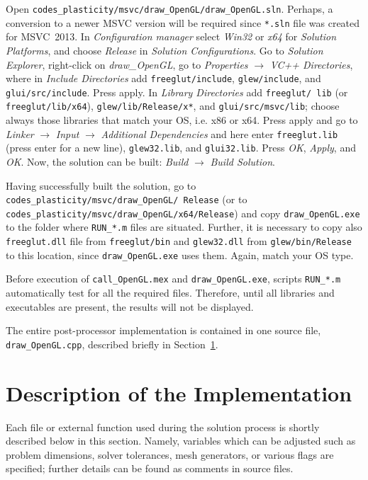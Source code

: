 \documentclass[preprint,12pt,authoryear]{elsarticle}
\begin{document}
Open \texttt{codes\_plasticity/msvc/draw\_OpenGL/draw\_OpenGL.sln}. Perhaps, a conversion to a newer MSVC version will be required since \texttt{*.sln} file was created for MSVC~2013. In \emph{Configuration manager} select \emph{Win32} or \emph{x64} for \emph{Solution Platforms}, and choose \emph{Release} in \emph{Solution Configurations}. Go to \emph{Solution Explorer}, right-click on \emph{draw\_OpenGL}, go to \emph{Properties} $\rightarrow$ \emph{VC++ Directories}, where in \emph{Include Directories} add \texttt{freeglut/include}, \texttt{glew/include}, and \texttt{glui/src/include}. Press apply. In \emph{Library Directories} add \texttt{freeglut/ lib} (or \texttt{freeglut/lib/x64}), \texttt{glew/lib/Release/x*}, and \texttt{glui/src/msvc/lib}; choose always those libraries that match your OS, i.e. x86 or x64. Press apply and go to \emph{Linker} $\rightarrow$ \emph{Input} $\rightarrow$ \emph{Additional Dependencies} and here enter \texttt{freeglut.lib} (press enter for a new line), \texttt{glew32.lib}, and \texttt{glui32.lib}. Press \emph{OK}, \emph{Apply}, and \emph{OK}. Now, the solution can be built: \emph{Build} $\rightarrow$ \emph{Build Solution}.

Having successfully built the solution, go to \texttt{codes\_plasticity/msvc/draw\_OpenGL/ Release} (or to \texttt{codes\_plasticity/msvc/draw\_OpenGL/x64/Release}) and copy \texttt{draw\_OpenGL.exe} to the folder where \texttt{RUN\_*.m} files are situated. Further, it is necessary to copy also \texttt{freeglut.dll} file from \texttt{freeglut/bin} and \texttt{glew32.dll} from \texttt{glew/bin/Release} to this location, since \texttt{draw\_OpenGL.exe} uses them. Again, match your OS type.

Before execution of \texttt{call\_OpenGL.mex} and \texttt{draw\_OpenGL.exe}, scripts \texttt{RUN\_*.m} automatically test for all the required files. Therefore, until all libraries and executables are present, the results will not be displayed.

The entire post-processor implementation is contained in one source file, \texttt{draw\_OpenGL.cpp}, described briefly in Section~\ref{Sect:5}.
%
%
\section{Description of the Implementation}
\label{Sect:5}
%
Each file or external function used during the solution process is shortly described below in this section. Namely, variables which can be adjusted such as problem dimensions, solver tolerances, mesh generators, or various flags are specified; further details can be found as comments in source files.
\end{document}
